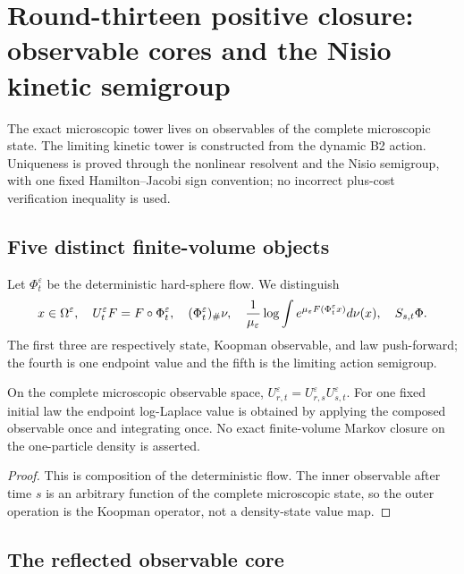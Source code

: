 \section{Round-thirteen positive closure: observable cores and the Nisio kinetic semigroup}
\label{sec:r13-b4}

The exact microscopic tower lives on observables of the complete microscopic
state.  The limiting kinetic tower is constructed from the dynamic B2 action.
Uniqueness is proved through the nonlinear resolvent and the Nisio semigroup,
with one fixed Hamilton--Jacobi sign convention; no incorrect plus-cost
verification inequality is used.

\subsection{Five distinct finite-volume objects}

Let $\Phi_t^\varepsilon$ be the deterministic hard-sphere flow.  We distinguish
\[
 x\in\Omega^\varepsilon,
 \quad U_t^\varepsilon F=F\circ\Phi_t^\varepsilon,
 \quad (\Phi_t^\varepsilon)_\#\nu,
 \quad {1\over\mu_\varepsilon}
       \log\int e^{\mu_\varepsilon F(\Phi_t^\varepsilon x)}d\nu(x),
 \quad S_{s,t}\Phi.
\]
The first three are respectively state, Koopman observable, and law
push-forward; the fourth is one endpoint value and the fifth is the limiting
action semigroup.

\begin{proposition}
\label{prop:r13-b4-tower}
On the complete microscopic observable space,
$U_{r,t}^\varepsilon=U_{r,s}^\varepsilon U_{s,t}^\varepsilon$.  For one fixed
initial law the endpoint log-Laplace value is obtained by applying the
composed observable once and integrating once.  No exact finite-volume
Markov closure on the one-particle density is asserted.
\end{proposition}

\begin{proof}
This is composition of the deterministic flow.  The inner observable after
time $s$ is an arbitrary function of the complete microscopic state, so the
outer operation is the Koopman operator, not a density-state value map.
\end{proof}

\subsection{The reflected observable core}

